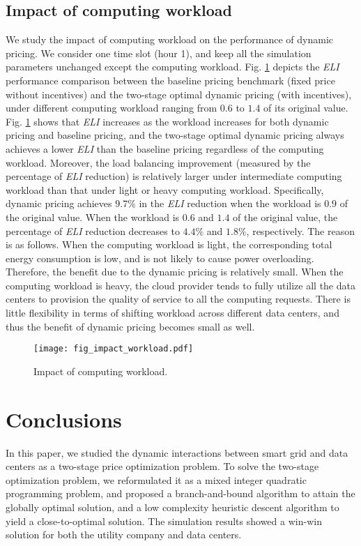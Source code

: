 \documentclass[journal]{IEEEtran}
\begin{document}
		
	\subsection{Impact of computing workload}
	We study the impact of computing workload on the performance of dynamic pricing. We consider one time slot (hour 1), and keep all the simulation parameters unchanged except the computing workload. Fig. \ref{fig_impact_workload} depicts the \emph{ELI} performance comparison between the baseline pricing benchmark (fixed price without incentives) and the two-stage optimal dynamic pricing (with incentives), under different computing workload ranging from $0.6$ to $1.4$ of its original value. Fig. \ref{fig_impact_workload} shows that \emph{ELI} increases as the workload increases for both dynamic pricing and baseline pricing, and the two-stage optimal dynamic pricing always achieves a lower \emph{ELI} than the baseline pricing regardless of the computing workload. Moreover, the load balancing improvement (measured by the percentage of \emph{ELI} reduction) is relatively larger under intermediate computing workload than that under light or heavy computing workload. Specifically, dynamic pricing achieves $9.7\%$ in the \emph{ELI} reduction when the workload is $0.9$ of the original value. When the workload is $0.6$ and $1.4$ of the original value, the percentage of \emph{ELI} reduction decreases to $4.4\%$ and $1.8\%$, respectively. The reason is as follows. When the computing workload is light, the corresponding total energy consumption is low, and is not likely to cause power overloading. Therefore, the benefit due to the dynamic pricing is relatively small. When the computing workload is heavy, the cloud provider tends to fully utilize all the data centers to provision the quality of service to all the computing requests. There is little flexibility in terms of shifting workload across different data centers, and thus the benefit of dynamic pricing becomes small as well.
	\begin{figure}[tbhp]
		\vspace{-4mm}
		\centering
		\texttt{[image: fig\_impact\_workload.pdf]}
		\caption{\label{fig_impact_workload} Impact of computing workload.}
		\vspace{-4mm}
	\end{figure}
	
	
	\section{Conclusions}
	In this paper, we studied the dynamic interactions between smart grid and data centers as a two-stage price optimization problem. To solve the two-stage optimization problem, we reformulated it as a mixed integer quadratic programming problem, and proposed a branch-and-bound algorithm to attain the globally optimal solution, and a low complexity heuristic descent algorithm to yield a close-to-optimal solution. The simulation results showed a win-win solution for both the utility company and data centers.
	
\end{document}
